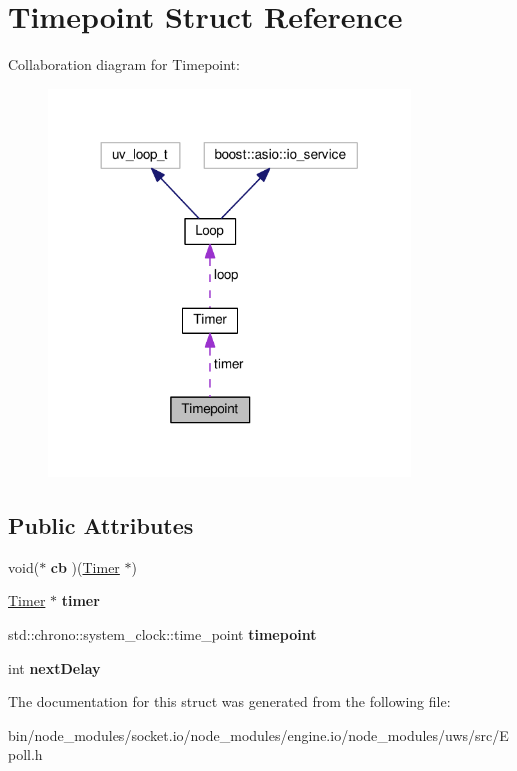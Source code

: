 \hypertarget{struct_timepoint}{}\section{Timepoint Struct Reference}
\label{struct_timepoint}


Collaboration diagram for Timepoint\+:
\nopagebreak
\begin{figure}[H]
\begin{center}
\leavevmode
\includegraphics[width=272pt]{struct_timepoint__coll__graph}
\end{center}
\end{figure}
\subsection*{Public Attributes}
\begin{DoxyCompactItemize}
\item 
\mbox{\label{struct_timepoint_a46265fa475c90135bee3b890fca2c2e2}} 
void($\ast$ {\bfseries cb} )(\mbox{\hyperlink{struct_timer}{Timer}} $\ast$)
\item 
\mbox{\label{struct_timepoint_a1468f5a79db532419a8ad756a2051128}} 
\mbox{\hyperlink{struct_timer}{Timer}} $\ast$ {\bfseries timer}
\item 
\mbox{\label{struct_timepoint_ac45a5ec957958b99c97c0dcb15696059}} 
std\+::chrono\+::system\+\_\+clock\+::time\+\_\+point {\bfseries timepoint}
\item 
\mbox{\label{struct_timepoint_afe4d4c8190601a391a25ae613f492860}} 
int {\bfseries next\+Delay}
\end{DoxyCompactItemize}


The documentation for this struct was generated from the following file\+:\begin{DoxyCompactItemize}
\item 
bin/node\+\_\+modules/socket.\+io/node\+\_\+modules/engine.\+io/node\+\_\+modules/uws/src/Epoll.\+h\end{DoxyCompactItemize}
